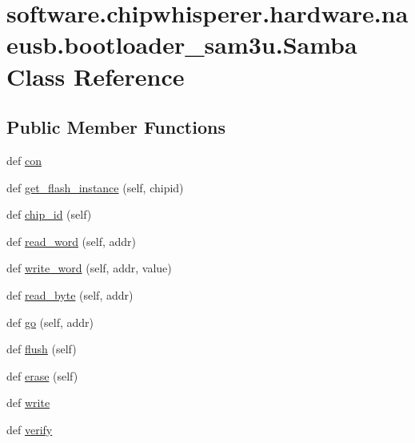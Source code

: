 \hypertarget{classsoftware_1_1chipwhisperer_1_1hardware_1_1naeusb_1_1bootloader__sam3u_1_1Samba}{}\section{software.\+chipwhisperer.\+hardware.\+naeusb.\+bootloader\+\_\+sam3u.\+Samba Class Reference}
\label{classsoftware_1_1chipwhisperer_1_1hardware_1_1naeusb_1_1bootloader__sam3u_1_1Samba}
\subsection*{Public Member Functions}
\begin{DoxyCompactItemize}
\item 
def \hyperlink{classsoftware_1_1chipwhisperer_1_1hardware_1_1naeusb_1_1bootloader__sam3u_1_1Samba_a5cb1e3d75f33a1f62244fb6636cacf30}{con}
\item 
def \hyperlink{classsoftware_1_1chipwhisperer_1_1hardware_1_1naeusb_1_1bootloader__sam3u_1_1Samba_ad0319341d74f687e5d0c9c1824fb61c5}{get\+\_\+flash\+\_\+instance} (self, chipid)
\item 
def \hyperlink{classsoftware_1_1chipwhisperer_1_1hardware_1_1naeusb_1_1bootloader__sam3u_1_1Samba_a952bd6f267b4cc01fc1170bea0e69bb5}{chip\+\_\+id} (self)
\item 
def \hyperlink{classsoftware_1_1chipwhisperer_1_1hardware_1_1naeusb_1_1bootloader__sam3u_1_1Samba_a5a7d1fb5f3cab1f6a755e6c96f528223}{read\+\_\+word} (self, addr)
\item 
def \hyperlink{classsoftware_1_1chipwhisperer_1_1hardware_1_1naeusb_1_1bootloader__sam3u_1_1Samba_a5fb8b8c092f014cd1116614d8e0945a9}{write\+\_\+word} (self, addr, value)
\item 
def \hyperlink{classsoftware_1_1chipwhisperer_1_1hardware_1_1naeusb_1_1bootloader__sam3u_1_1Samba_a49f61820133ace6d29b273e1c4628e6d}{read\+\_\+byte} (self, addr)
\item 
def \hyperlink{classsoftware_1_1chipwhisperer_1_1hardware_1_1naeusb_1_1bootloader__sam3u_1_1Samba_a0af6f4cf908b7126dc0e4cf173d29f7f}{go} (self, addr)
\item 
def \hyperlink{classsoftware_1_1chipwhisperer_1_1hardware_1_1naeusb_1_1bootloader__sam3u_1_1Samba_af72e74f4377befad8ccdc15209e53196}{flush} (self)
\item 
def \hyperlink{classsoftware_1_1chipwhisperer_1_1hardware_1_1naeusb_1_1bootloader__sam3u_1_1Samba_a7f5f98860a32c0458f86bf12c8b5925b}{erase} (self)
\item 
def \hyperlink{classsoftware_1_1chipwhisperer_1_1hardware_1_1naeusb_1_1bootloader__sam3u_1_1Samba_a5bc0160ace0704176f1864e6913514fb}{write}
\item 
def \hyperlink{classsoftware_1_1chipwhisperer_1_1hardware_1_1naeusb_1_1bootloader__sam3u_1_1Samba_ab1cf7a1c76e8bf0145fc186da6b9a905}{verify}
\end{DoxyCompactItemize}
